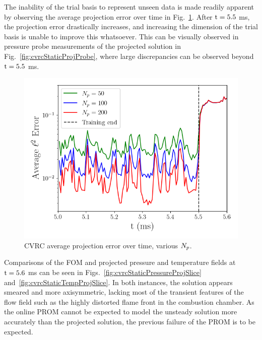 The inability of the trial basis to represent unseen data is made readily apparent by observing the average projection error over time in Fig.~\ref{fig:cvrcStaticProjTime}. After $\text{t} = 5.5$ ms, the projection error drastically increases, and increasing the dimension of the trial basis is unable to improve this whatsoever. This can be visually observed in pressure probe measurements of the projected solution in Fig.~\ref{fig:cvrcStaticProjProbe}, where large discrepancies can be observed beyond $\text{t} = 5.5$ ms. 

\begin{figure}
    \centering
    \includegraphics[width=0.75\linewidth]{Chapters/AdaptiveResults/Images/cvrc/proj_err_time.png}
    \caption{\label{fig:cvrcStaticProjTime}CVRC average projection error over time, various $N_p$.}
\end{figure}

Comparisons of the FOM and projected pressure and temperature fields at $\text{t} = 5.6$ ms can be seen in Figs.~\ref{fig:cvrcStaticPressureProjSlice} and~\ref{fig:cvrcStaticTempProjSlice}. In both instances, the solution appears smeared and more axisymmetric, lacking most of the transient features of the flow field such as the  highly distorted flame front in the combustion chamber. As the online PROM cannot be expected to model the unsteady solution more accurately than the projected solution, the previous failure of the PROM is to be expected.


